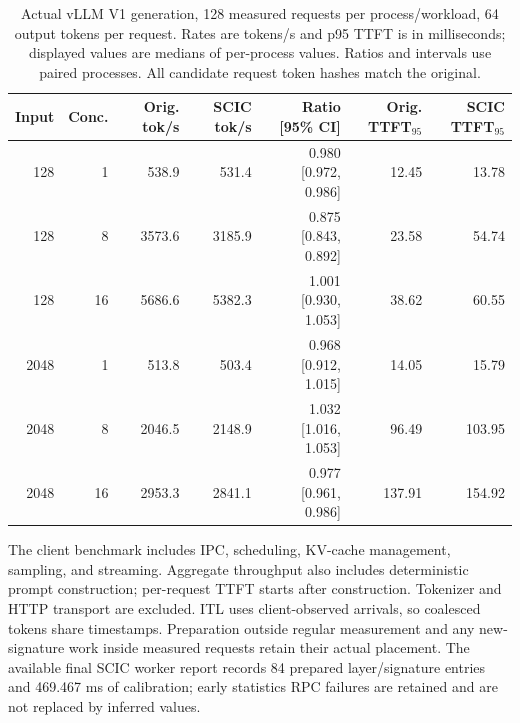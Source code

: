 \begin{table}[t]

\centering\small

\caption{Actual vLLM V1 generation, 128 measured requests per process/workload, 64 output tokens per request. Rates are tokens/s and p95 TTFT is in milliseconds; displayed values are medians of per-process values. Ratios and intervals use paired processes. All candidate request token hashes match the original.}

\label{tab:vllm-serving}

\begin{tabular}{@{}rrrrrrr@{}}

\toprule

Input & Conc. & Orig. tok/s & SCIC tok/s & Ratio [95\% CI] & Orig. TTFT$_{95}$ & SCIC TTFT$_{95}$ \\

\midrule

128 & 1 & 538.9 & 531.4 & 0.980 [0.972, 0.986] & 12.45 & 13.78 \\

128 & 8 & 3573.6 & 3185.9 & 0.875 [0.843, 0.892] & 23.58 & 54.74 \\

128 & 16 & 5686.6 & 5382.3 & 1.001 [0.930, 1.053] & 38.62 & 60.55 \\

2048 & 1 & 513.8 & 503.4 & 0.968 [0.912, 1.015] & 14.05 & 15.79 \\

2048 & 8 & 2046.5 & 2148.9 & 1.032 [1.016, 1.053] & 96.49 & 103.95 \\

2048 & 16 & 2953.3 & 2841.1 & 0.977 [0.961, 0.986] & 137.91 & 154.92 \\

\bottomrule

\end{tabular}

\end{table}

The client benchmark includes IPC, scheduling, KV-cache management, sampling, and streaming. Aggregate throughput also includes deterministic prompt construction; per-request TTFT starts after construction. Tokenizer and HTTP transport are excluded. ITL uses client-observed arrivals, so coalesced tokens share timestamps. Preparation outside regular measurement and any new-signature work inside measured requests retain their actual placement. The available final SCIC worker report records 84 prepared layer/signature entries and 469.467 ms of calibration; early statistics RPC failures are retained and are not replaced by inferred values.

